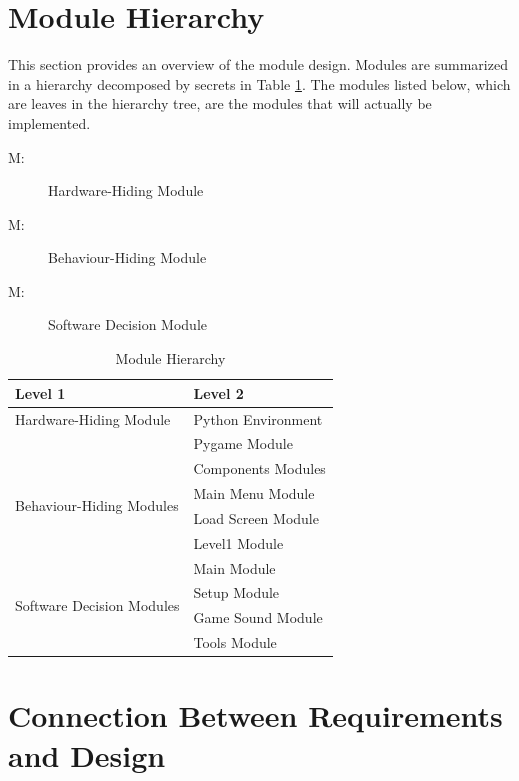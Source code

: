 \documentclass[12pt, titlepage]{article}
\newcounter{mnum}
\newcommand{\mthemnum}{M\themnum}
\begin{document}
\section{Module Hierarchy} \label{SecMH}

This section provides an overview of the module design. Modules are summarized
in a hierarchy decomposed by secrets in Table \ref{TblMH}. The modules listed
below, which are leaves in the hierarchy tree, are the modules that will
actually be implemented.

\begin{description}
\item [ \mthemnum \label{mHH}:] Hardware-Hiding Module
\item [ \mthemnum \label{mBH}:] Behaviour-Hiding Module
\item [ \mthemnum \label{mSD}:] Software Decision Module
\end{description}


\begin{table}[h!]
\centering
\begin{tabular}{p{} p{}}
\toprule
\textbf{Level 1} & \textbf{Level 2}\\
\midrule

{Hardware-Hiding Module} & Python Environment\\
& Pygame Module\\
\midrule

\multirow{4}{0.3\textwidth}{Behaviour-Hiding Modules} & Components Modules\\
& Main Menu Module\\
& Load Screen Module\\
& Level1 Module\\
\midrule

\multirow{4}{0.3\textwidth}{Software Decision Modules} & Main Module\\
& Setup Module\\
& Game Sound Module\\
& Tools Module\\
\bottomrule

\end{tabular}
\caption{Module Hierarchy}
\label{TblMH}
\end{table}

\section{Connection Between Requirements and Design} \label{SecConnection}
\end{document}
